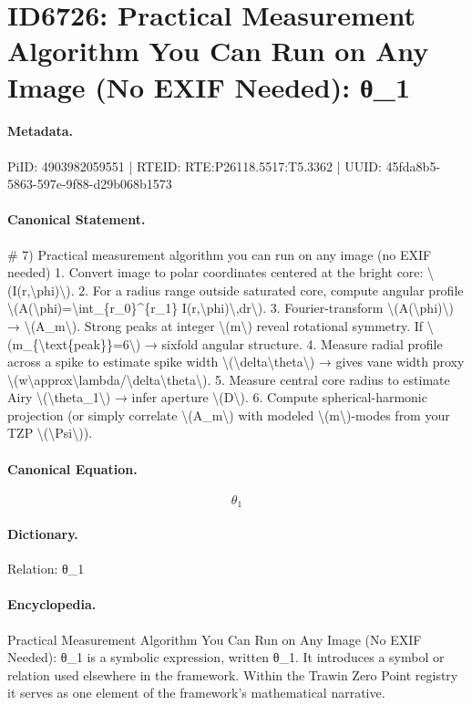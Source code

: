 \section*{ID6726: Practical Measurement Algorithm You Can Run on Any Image (No EXIF Needed): θ\_1}
\paragraph{Metadata.}
PiID: 4903982059551 | RTEID: RTE:P26118.5517:T5.3362 | UUID: 45fda8b5-5863-597e-9f88-d29b068b1573

\paragraph{Canonical Statement.}
\# 7) Practical measurement algorithm you can run on any image (no EXIF needed) 1. Convert image to polar coordinates centered at the bright core: \textbackslash{}(I(r,\textbackslash{}phi)\textbackslash{}). 2. For a radius range outside saturated core, compute angular profile \textbackslash{}(A(\textbackslash{}phi)=\textbackslash{}int\_\{r\_0\}\textasciicircum{}\{r\_1\} I(r,\textbackslash{}phi)\textbackslash{},dr\textbackslash{}). 3. Fourier-transform \textbackslash{}(A(\textbackslash{}phi)\textbackslash{}) → \textbackslash{}(A\_m\textbackslash{}). Strong peaks at integer \textbackslash{}(m\textbackslash{}) reveal rotational symmetry. If \textbackslash{}(m\_\{\textbackslash{}text\{peak\}\}=6\textbackslash{}) → sixfold angular structure. 4. Measure radial profile across a spike to estimate spike width \textbackslash{}(\textbackslash{}delta\textbackslash{}theta\textbackslash{}) → gives vane width proxy \textbackslash{}(w\textbackslash{}approx\textbackslash{}lambda/\textbackslash{}delta\textbackslash{}theta\textbackslash{}). 5. Measure central core radius to estimate Airy \textbackslash{}(\textbackslash{}theta\_1\textbackslash{}) → infer aperture \textbackslash{}(D\textbackslash{}). 6. Compute spherical-harmonic projection (or simply correlate \textbackslash{}(A\_m\textbackslash{}) with modeled \textbackslash{}(m\textbackslash{})-modes from your TZP \textbackslash{}(\textbackslash{}Psi\textbackslash{})).

\paragraph{Canonical Equation.}
\[
\theta_1
\]

\paragraph{Dictionary.}
Relation: θ\_1

\paragraph{Encyclopedia.}
Practical Measurement Algorithm You Can Run on Any Image (No EXIF Needed): θ\_1 is a symbolic expression, written θ\_1. It introduces a symbol or relation used elsewhere in the framework. Within the Trawin Zero Point registry it serves as one element of the framework's mathematical narrative.
